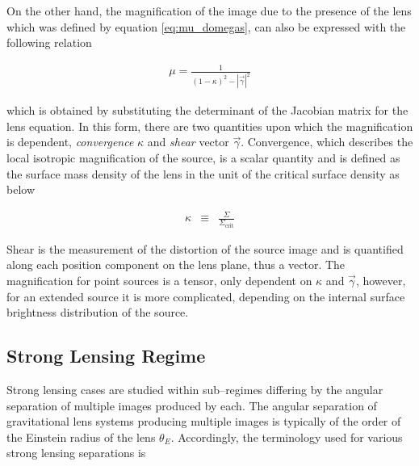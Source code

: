 \documentclass[a4wide,12pt]{book}
\begin{document}
{On the other hand, the magnification of the image due to the presence of the lens which was defined by equation \ref{eq:mu_domegas}, can also be expressed with the following relation 

\begin{eqnarray}
\label{eq:mu_kappa_gamma}
\mu = \frac{1}{(1 - \kappa)^2 - |\vec{\gamma}|^2}
\end{eqnarray}

which is obtained by substituting the determinant of the Jacobian matrix for the lens equation. In this form, there are two quantities upon which the magnification is dependent, \emph{convergence} $\kappa$ and \emph{shear} vector $\vec{\gamma}$. Convergence, which describes the local isotropic magnification of the source, is a scalar quantity and is defined as the surface mass density of the lens in the unit of the critical surface density as below

\begin{eqnarray}
\label{eq:convergence}
\kappa &\equiv& \frac{\Sigma}{\Sigma_{\mathrm{crit}}}
\end{eqnarray}

 Shear is the measurement of the distortion of the source image and is quantified along each position component on the lens plane, thus a vector. The magnification for point sources is a tensor, only dependent on $\kappa$ and $\vec{\gamma}$, however, for an extended source it is more complicated, depending on the internal surface brightness distribution of the source.


\subsection{Strong Lensing Regime}
Strong lensing cases are studied within sub--regimes differing by the angular separation of multiple images produced by each. The angular separation of gravitational lens systems producing multiple images is typically of the order of the Einstein radius of the lens $\theta_E$. Accordingly, the terminology used for various strong lensing separations is

}
\end{document}
